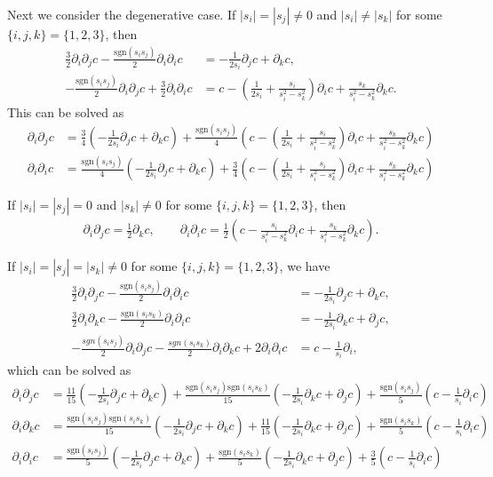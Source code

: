 \documentclass[10pt]{article}
\newcommand{\sgn}[1]{\ensuremath{\mathrm{sgn}\left(#1\right)}}
\begin{document}
Next we consider the degenerative case.
If $|s_i| = |s_j| \neq 0$ and $|s_i| \neq |s_k|$ for some $\{i,j,k\}=\{1,2,3\}$, then
\begin{align*}
	\frac{3}{2} \partial_i\partial_jc - \frac{\sgn{s_is_j}}{2} \partial_i\partial_ic &= -\frac{1}{2s_i}\partial_jc + \partial_kc, \\
	-\frac{\sgn{s_is_j}}{2} \partial_i\partial_jc + \frac{3}{2} \partial_i\partial_ic &= c - \left(\frac{1}{2s_i}+\frac{s_i}{s_i^2-s_k^2}\right) \partial_ic + \frac{s_k}{s_i^2-s_k^2} \partial_kc.
\end{align*}
This can be solved as
\begin{align}
	\partial_i\partial_jc &= \frac{3}{4} \left( -\frac{1}{2s_i}\partial_jc + \partial_kc \right) + \frac{\sgn{s_is_j}}{4} \left( c - \left(\frac{1}{2s_i}+\frac{s_i}{s_i^2-s_k^2}\right) \partial_ic + \frac{s_k}{s_i^2-s_k^2} \partial_kc \right) \\
	\partial_i\partial_ic &= \frac{\sgn{s_is_j}}{4} \left( -\frac{1}{2s_i}\partial_jc + \partial_kc \right) + \frac{3}{4} \left( c - \left(\frac{1}{2s_i}+\frac{s_i}{s_i^2-s_k^2}\right) \partial_ic + \frac{s_k}{s_i^2-s_k^2} \partial_kc \right)
\end{align}

If $|s_i|=|s_j|=0$ and $|s_k|\neq 0$ for some $\{i,j,k\}=\{1,2,3\}$, then
\begin{align}
	\partial_i\partial_jc = \frac{1}{2}\partial_kc, \qquad \partial_i\partial_ic = \frac{1}{2}\left(c - \frac{s_i}{s_i^2-s_k^2}\partial_ic + \frac{s_k}{s_i^2-s_k^2}\partial_kc\right).
\end{align}

If $|s_i|=|s_j|=|s_k| \neq 0$ for some $\{i,j,k\} = \{1,2,3\}$, we have
\begin{align*}
	\frac{3}{2} \partial_i\partial_jc - \frac{\sgn{s_is_j}}{2} \partial_i\partial_ic &= -\frac{1}{2s_i}\partial_jc + \partial_kc, \\
	\frac{3}{2} \partial_i\partial_kc - \frac{\sgn{s_is_k}}{2} \partial_i\partial_ic &= -\frac{1}{2s_i}\partial_kc + \partial_jc, \\
	-\frac{sgn(s_is_j)}{2} \partial_i\partial_jc - \frac{sgn(s_is_k)}{2} \partial_i\partial_kc + 2\partial_i\partial_ic &= c - \frac{1}{s_i}\partial_i,
\end{align*}
which can be solved as
\begin{align}
	\partial_i\partial_jc &= \frac{11}{15}\left( -\frac{1}{2s_i}\partial_jc + \partial_kc \right) + \frac{\sgn{s_is_j}\sgn{s_is_k}}{15}\left( -\frac{1}{2s_i}\partial_kc + \partial_jc \right) + \frac{\sgn{s_is_j}}{5}\left( c - \frac{1}{s_i}\partial_ic \right) \\
	\partial_i\partial_kc &= \frac{\sgn{s_is_j}\sgn{s_is_k}}{15}\left( -\frac{1}{2s_i}\partial_jc + \partial_kc \right) + \frac{11}{15}\left( -\frac{1}{2s_i}\partial_kc + \partial_jc \right) + \frac{\sgn{s_is_k}}{5}\left( c - \frac{1}{s_i}\partial_ic \right) \\
	\partial_i\partial_ic &= \frac{\sgn{s_is_j}}{5}\left( -\frac{1}{2s_i}\partial_jc + \partial_kc \right) + \frac{\sgn{s_is_k}}{5}\left( -\frac{1}{2s_i}\partial_kc + \partial_jc \right) + \frac{3}{5}\left( c - \frac{1}{s_i}\partial_ic \right)
\end{align}
\end{document}
